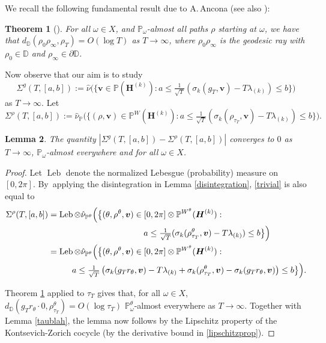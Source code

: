 \documentclass[JEP,XML,SOM,Unicode,published]{cedram}
\DeclareMathOperator{\Leb}{Leb}
\theoremstyle{plain}
\newtheorem{thm}{Theorem}[section]
\newtheorem{lemma}[thm]{Lemma}
\theoremstyle{definition}
\numberwithin{equation}{subsection}
\newcommand\bD{\mathbb{D}}
\newcommand\bP{\mathbb{P}}
\newcommand{\bfH}{\boldsymbol{H}}
\newcommand{\bfv}{\boldsymbol{v}}
\newcommand{\defeq}{:=}
\begin{document}
We recall the following fundamental result due to A.\,Ancona \cite{Anc90} (see also \cite[Lem.\,4.1]{Gru98}):

\begin{thm}[{\cite[Th.\,7.3]{Anc90}}]\label{Ancona}
For all $\omega \in X$, and $\bP_\omega$-almost all paths $\rho$ starting at $\omega$, we have that $d_{\bD}(\rho_{0}\rho_{\infty}, \rho_{T}) = O(\log T)$ as $T\to\infty$, where $\rho_{0}\rho_{\infty}$ is the geodesic ray with $\rho_{0}\in \bD$ and $\rho_{\infty} \in \partial \bD$.
\end{thm}

Now observe that our aim is to study
\[
\Sigma^{g}(T,[a,b]) \defeq \hat{\nu}\bigl(\bigl\{\bfv \in \bP(\bfH^{(k)}) :a \leq \tfrac{1}{\sqrt{T}} (\sigma_k(g_{T}, \bfv)- T\lambda_{(k)}) \leq b \bigr\} \bigr)
\]
as $T\to\infty$. Let
\begin{equation}\label{trivial}
\Sigma^{\rho}(T,[a,b]) \defeq \hat{\nu}_{\bP} \bigl(\bigl\{(\rho,\bfv) \in \bP^W(\bfH^{(k)}) :a \leq \tfrac{1}{\sqrt{T}} (\sigma_k(\rho_{\tau_{T}}, \bfv)- T\lambda_{(k)}) \leq b \bigr\} \bigr).
\end{equation}

\begin{lemma}\label{Ancona2}
The quantity
$|\Sigma^{g}(T,[a,b])-\Sigma^{\rho}(T,[a,b])|$ converges to $0$ as $T\to\infty$, $\bP_\omega$-almost everywhere and for all $\omega \in X$.
\end{lemma}
\begin{proof}
Let $\Leb$ denote the normalized Lebesgue (probability) measure on $[0, 2\pi]$. By~applying the disintegration in Lemma \ref{disintegration}, \eqref{trivial} is also equal to
\begin{align*}
\Sigma^{\rho}(T,[a,b]) &= \Leb \otimes \hat{\nu}_{\bP^\theta} \Bigl(\bigl\{(\theta,\rho^\theta,\bfv) \in [0,2\pi]\otimes \bP^{W^\theta}(\bfH^{(k)}) :\\
&\hspace*{4cm} a \leq \tfrac{1}{\sqrt{T}} (\sigma_k(\rho^\theta_{\tau_{T}}, \bfv)- T\lambda_{(k)}) \leq b \bigr\} \Bigr) \\
&= \Leb \otimes \hat{\nu}_{\bP^\theta} \Bigl(\bigl\{(\theta,\rho^\theta,\bfv) \in [0,2\pi]\otimes \bP^{W^\theta}(\bfH^{(k)}) :
\\
& \hspace*{1cm} a \leq \tfrac{1}{\sqrt{T}} \left(\sigma_k(g_T r_\theta, \bfv)- T\lambda_{(k)} +\sigma_k(\rho^\theta_{\tau_{T}}, \bfv)-\sigma_k(g_T r_\theta, \bfv)\right)\leq b \bigr\} \Bigr).
\end{align*}

Theorem \ref{Ancona} applied to $\tau_T$ gives that, for all $\omega \in X$, $d_{\bD}(g_T r_\theta \cdot 0, \rho^\theta_{\tau_T}) = O(\log \tau_T)$ $\bP^\theta_\omega$-almost everywhere as $T\to\infty$. Together with Lemma \ref{taublah}, the lemma now follows by the Lipschitz property of the Kontsevich-Zorich cocycle (by the derivative bound in \eqref{lipschitzprop}).
\end{proof}
\end{document}
